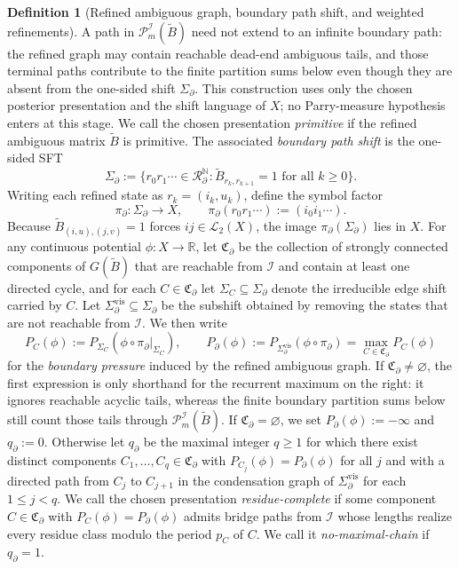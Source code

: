 \documentclass{etds}%
\numberwithin{equation}{section}
\theoremstyle{plain}
\theoremstyle{definition}
\newtheorem{definition}[theorem]{Definition}
\theoremstyle{remark}
\newcommand{\NN}{\mathbb{N}}
\begin{document}
\begin{definition}[Refined ambiguous graph, boundary path shift, and weighted refinements]
A path in $\mathcal{P}_m^{\mathcal{I}}(\widetilde{B})$ need not extend to an
infinite boundary path: the refined graph may contain reachable dead-end
ambiguous tails, and those terminal paths contribute to the finite partition
sums below even though they are absent from the one-sided shift
$\Sigma_\partial$.
This construction uses only the chosen posterior presentation and the shift
language of $X$; no Parry-measure hypothesis enters at this stage.  We call
the chosen presentation \emph{primitive} if the refined ambiguous matrix
$\widetilde{B}$ is primitive.
The associated \emph{boundary path shift} is the one-sided SFT
\[
\Sigma_\partial
:=\{r_0r_1\cdots\in\mathcal{R}_\partial^{\NN}:
\widetilde{B}_{r_k,r_{k+1}}=1\text{ for all }k\ge 0\}.
\]
Writing each refined state as $r_k=(i_k,u_k)$, define the symbol factor
\[
\pi_\partial:\Sigma_\partial\to X,
\qquad
\pi_\partial(r_0r_1\cdots):=(i_0i_1\cdots).
\]
Because $\widetilde{B}_{(i,u),(j,v)}=1$ forces $ij\in\mathcal{L}_2(X)$,
the image $\pi_\partial(\Sigma_\partial)$ lies in $X$.  For any continuous
potential $\phi:X\to\mathbb{R}$, let $\mathfrak{C}_\partial$ be the collection of strongly connected components
of $G(\widetilde{B})$ that are reachable from $\mathcal{I}$ and contain at
least one directed cycle, and for each $C\in\mathfrak{C}_\partial$ let
$\Sigma_C\subseteq\Sigma_\partial$ denote the irreducible edge shift carried by
$C$.  Let $\Sigma_\partial^{\mathrm{vis}}\subseteq\Sigma_\partial$ be the
subshift obtained by removing the states that are not reachable from
$\mathcal{I}$.  We then write
\[
P_C(\phi):=P_{\Sigma_C}(\phi\circ\pi_\partial|_{\Sigma_C}),
\qquad
P_\partial(\phi):=P_{\Sigma_\partial^{\mathrm{vis}}}(\phi\circ\pi_\partial)
=\max_{C\in\mathfrak{C}_\partial}P_C(\phi)
\]
for the \emph{boundary pressure} induced by the refined ambiguous graph.  If
$\mathfrak{C}_\partial\neq\varnothing$, the first expression is only shorthand
for the recurrent maximum on the right: it ignores reachable acyclic tails,
whereas the finite boundary partition sums below still count those tails
through $\mathcal{P}_m^{\mathcal{I}}(\widetilde{B})$.  If
$\mathfrak{C}_\partial=\varnothing$, we set $P_\partial(\phi):=-\infty$ and
$q_\partial:=0$.  Otherwise let $q_\partial$ be the maximal integer $q\ge 1$
for which there exist distinct components
$C_1,\dots,C_q\in\mathfrak{C}_\partial$ with
$P_{C_j}(\phi)=P_\partial(\phi)$ for all $j$ and with a directed path from
$C_j$ to $C_{j+1}$ in the condensation graph of
$\Sigma_\partial^{\mathrm{vis}}$ for each $1\le j<q$.  We call the chosen
presentation \emph{residue-complete} if some component
$C\in\mathfrak{C}_\partial$ with $P_C(\phi)=P_\partial(\phi)$ admits bridge
paths from $\mathcal{I}$ whose lengths realize every residue class modulo the
period $p_C$ of $C$.  We call it \emph{no-maximal-chain} if $q_\partial=1$.
\end{definition}
\end{document}
